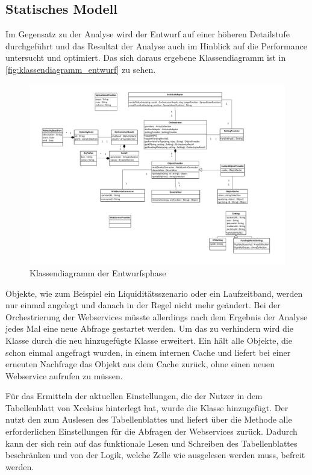 \begin{onehalfspacing}
\subsection{Statisches Modell}
Im Gegensatz zu der Analyse wird der Entwurf auf einer höheren Detailstufe durchgeführt und das Resultat der Analyse auch im Hinblick auf die Performance untersucht und optimiert. Das sich daraus ergebene Klassendiagramm ist in \vref{fig:klassendiagramm_entwurf} zu sehen.


\begin{figure}[h]
\centering
\setlength{\unitlength}{1mm}
\includegraphics[width=15cm]{Visio/Entwurf.pdf}
\caption{Klassendiagramm der Entwurfsphase\label{fig:klassendiagramm_entwurf}}
\end{figure}

Objekte, wie zum Beispiel ein Liquiditätsszenario oder ein Laufzeitband, werden nur einmal angelegt und danach in der Regel nicht mehr geändert. Bei der Orchestrierung der Webservices müsste allerdings nach dem Ergebnis der Analyse jedes Mal eine neue Abfrage gestartet werden. Um das zu verhindern wird die Klasse  durch die neu hinzugefügte Klasse  erweitert. Ein  hält alle Objekte, die schon einmal angefragt wurden, in einem internen Cache und liefert bei einer erneuten Nachfrage das Objekt aus dem Cache zurück, ohne einen neuen Webservice aufrufen zu müssen.

Für das Ermitteln der aktuellen Einstellungen, die der Nutzer in dem Tabellenblatt von Xcelsius hinterlegt hat, wurde die Klasse  hinzugefügt. Der  nutzt den  zum Auslesen des Tabellenblattes und liefert über die Methode  alle erforderlichen Einstellungen für die Abfragen der Webservices zurück. Dadurch kann der  sich rein auf das funktionale Lesen und Schreiben des Tabellenblattes beschränken und von der Logik, welche Zelle wie ausgelesen werden muss, befreit werden.


\end{onehalfspacing}
